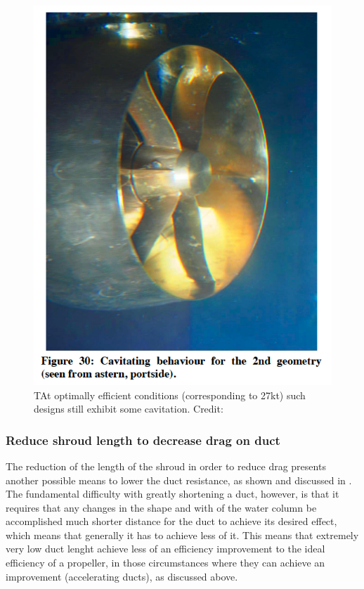 \documentclass{article}\usepackage[]{graphicx}\usepackage[]{color}
\begin{document}
\begin{figure}
\includegraphics[width=\textwidth]{FineCavitation.png}
\caption{TAt optimally efficient conditions (corresponding to 27kt) such designs still exhibit some cavitation. Credit: \cite{abdel2010}}
\label{fig:FineCavitation.png}
\end{figure}

\subsubsection{Reduce shroud length to decrease drag on duct}
The reduction of the length of the shroud in order to reduce drag presents another possible means to lower the duct resistance, as shown and discussed in \cite[21-25]{oosterveld1970}. The fundamental difficulty with greatly shortening a duct, however, is that it requires that any changes in the shape and with of the water column be accomplished much shorter distance for the duct to achieve its desired effect, which means that generally it has to achieve less of it.  This means that extremely very low duct lenght achieve less of an efficiency improvement to the ideal efficiency of a propeller, in those circumstances where they can achieve an improvement  (accelerating ducts), as discussed above.
\end{document}
